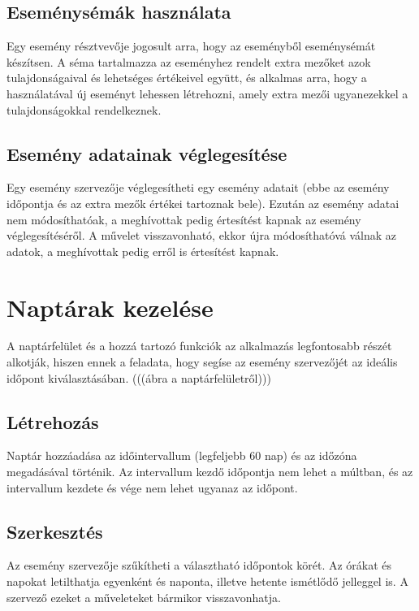 \documentclass[a4paper,12pt]{report}
\theoremstyle{definition}
\theoremstyle{remark}
\begin{document}
	\subsection{Eseménysémák használata}

Egy esemény résztvevője jogosult arra, hogy az eseményből eseménysémát készítsen. A séma tartalmazza az eseményhez rendelt extra mezőket azok tulajdonságaival és lehetséges értékeivel együtt, és alkalmas arra, hogy a használatával új eseményt lehessen létrehozni, amely extra mezői ugyanezekkel a tulajdonságokkal rendelkeznek.

	\subsection{Esemény adatainak véglegesítése}

Egy esemény szervezője véglegesítheti egy esemény adatait (ebbe az esemény időpontja és az extra mezők értékei tartoznak bele).  Ezután az esemény adatai nem módosíthatóak, a meghívottak pedig értesítést kapnak az esemény véglegesítéséről. A művelet visszavonható, ekkor újra módosíthatóvá válnak az adatok, a meghívottak pedig erről is értesítést kapnak.

\section{Naptárak kezelése}

A naptárfelület és a hozzá tartozó funkciók az alkalmazás legfontosabb részét alkotják, hiszen ennek a feladata, hogy segíse az esemény szervezőjét az ideális időpont kiválasztásában. (((ábra a naptárfelületről)))

	\subsection{Létrehozás}

Naptár hozzáadása az időintervallum (legfeljebb 60 nap) és az időzóna megadásával történik. Az intervallum kezdő időpontja nem lehet a múltban, és az intervallum kezdete és vége nem lehet ugyanaz az időpont.

	\subsection{Szerkesztés}

Az esemény szervezője szűkítheti a választható időpontok körét. Az órákat és napokat letilthatja egyenként és naponta, illetve hetente ismétlődő jelleggel is. A szervező ezeket a műveleteket bármikor visszavonhatja.
\end{document}
